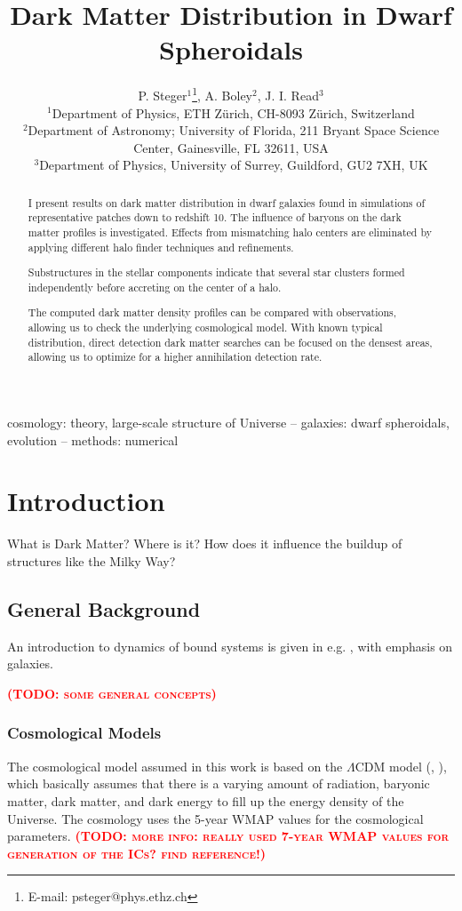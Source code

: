 \documentclass[useAMS,usenatbib]{mn2e}
\title[Dark Matter Distribution in Dwarf Spheroidals]
     {Dark Matter Distribution in Dwarf Spheroidals}
\author[P. Steger et al.]{P. Steger$^{1}$\thanks{E-mail: psteger@phys.ethz.ch},
 A. Boley$^{2}$,
 J. I. Read$^{3}$\\
 $^{1}$Department of Physics, ETH Z\"urich, CH-8093 Z\"urich,
 Switzerland\\
 $^{2}$Department of Astronomy; University of Florida, 211 Bryant
 Space Science Center, Gainesville, FL 32611, USA\\
 $^{3}$Department of Physics, University of Surrey, Guildford, GU2 7XH, UK
}
\newcommand{\TODO}[1]{\textsc{\textbf{\textcolor{red}{(TODO: #1)}}}}
\begin{document}
\maketitle

\label{firstpage}
\begin{abstract}
    I present results on dark matter distribution in dwarf galaxies
    found in simulations of representative patches down to redshift
    10. The influence of baryons on the dark matter profiles is
    investigated. Effects from mismatching halo centers are eliminated
    by applying different halo finder techniques and refinements.

    Substructures in the stellar components indicate that several star
    clusters formed independently before accreting on the center of a
    halo.

    The computed dark matter density profiles can be compared with
    observations, allowing us to check the underlying cosmological
    model. With known typical distribution, direct detection dark
    matter searches can be focused on the densest areas, allowing us
    to optimize for a higher annihilation detection rate.
\end{abstract}
%
\begin{keywords}
 cosmology: theory, large-scale structure of Universe --
 galaxies: dwarf spheroidals, evolution --
 methods: numerical
\end{keywords}
%
\section{Introduction}
\label{sec:intro}
What is Dark Matter? Where is it? How does it influence the buildup of
structures like the Milky Way?

\subsection{General Background}
An introduction to dynamics of bound systems is given in
e.g. \cite{Binney2008}, with emphasis on galaxies.


\TODO{some general concepts}

\subsubsection{Cosmological Models}
The cosmological model assumed in this work is based on the
$\Lambda$CDM model (\cite{Weinberg2008}, \cite{Peacock1999}), which
basically assumes that there is a varying amount of radiation,
baryonic matter, dark matter, and dark energy to fill up the energy
density of the Universe. The cosmology uses the 5-year WMAP values
\citep{Komatsu2009} for the cosmological parameters. \TODO{more info:
  really used 7-year WMAP values for generation of the ICs? find
  reference!}
\end{document}
